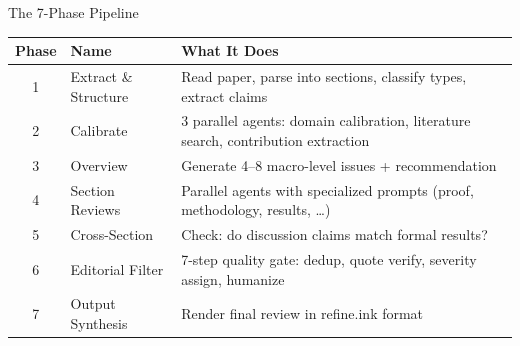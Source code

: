 \documentclass[10pt,english,aspectratio=169]{beamer}
\begin{document}
\begin{frame}{The 7-Phase Pipeline}
\vspace{0.2cm}
\begin{small}
\begin{tabular}{clp{8cm}}
\toprule
\textbf{Phase} & \textbf{Name} & \textbf{What It Does} \\
\midrule
1 & Extract \& Structure & Read paper, parse into sections, classify types, extract claims \\
2 & Calibrate & 3 parallel agents: domain calibration, literature search, contribution extraction \\
3 & Overview & Generate 4--8 macro-level issues + recommendation \\
4 & Section Reviews & Parallel agents with specialized prompts (proof, methodology, results, \ldots) \\
5 & Cross-Section & Check: do discussion claims match formal results? \\
6 & Editorial Filter & 7-step quality gate: dedup, quote verify, severity assign, humanize \\
7 & Output Synthesis & Render final review in refine.ink format \\
\bottomrule
\end{tabular}
\end{small}

\end{frame}
\end{document}
